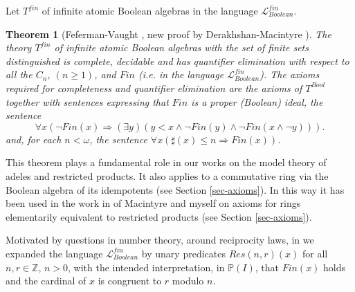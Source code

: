 \documentclass[12pt]{amsart}
\def\P{\mathbb{P}}
\def\Z{\mathbb{Z}}
\newtheorem{thm}{Theorem}[section]
\numberwithin{equation}{section}
\begin{document}
                                                                                                                                                                                                                                                                                                                                                                                                                                                                                                                                                                                                                                                                                                                                                                                                                                                                        

Let $T^{fin}$ of infinite atomic Boolean algebras in the language $\mathcal{L}_{Boolean}^{fin}$.

\begin{thm}[Feferman-Vaught {\cite{FV}, new proof by Derakhshan-Macintyre \cite{DM-bool}}] 
\label{bool1}The theory $T^{fin}$ of infinite atomic Boolean algebras with the 
set of finite sets distinguished is complete, decidable and 
has quantifier elimination with respect to all the $C_n$, $(n\geq 1)$, and $Fin$ (i.e. in the language 
$\mathcal{L}_{Boolean}^{fin}$). The axioms required for completeness and quantifier elimination are the 
axioms of $T^{Bool}$ together with 
sentences expressing that $Fin$ is a proper (Boolean) ideal, the sentence
$$
\forall x (\neg Fin(x) \Rightarrow (\exists y)(y<x \wedge \neg Fin(y) \wedge \neg Fin(x\wedge \neg y))).
$$
and, for each $n<\omega$, the sentence $\forall x (\sharp(x)\leq n \Rightarrow Fin(x))$.
\end{thm}

This theorem plays a fundamental role in our works on the model theory of adeles and restricted products. 
It also applies to a commutative ring via the Boolean algebra of its idempotents (see Section \ref{sec-axioms}). In this way it has been used in the work in \cite{DM-axioms} of Macintyre and myself 
on axioms for rings elementarily equivalent to restricted products (see Section \ref{sec-axioms}).

Motivated by questions in number theory, around reciprocity laws, in \cite{DM-bool} we expanded the language 
$\mathcal{L}_{Boolean}^{fin}$ by unary predicates $Res(n,r)(x)$ for all $n,r\in \Z$, $n>0$, with the intended interpretation, in $\P(I)$, 
that $Fin(x)$ holds and the cardinal of $x$ is congruent to $r$ modulo $n$. 
\end{document}
